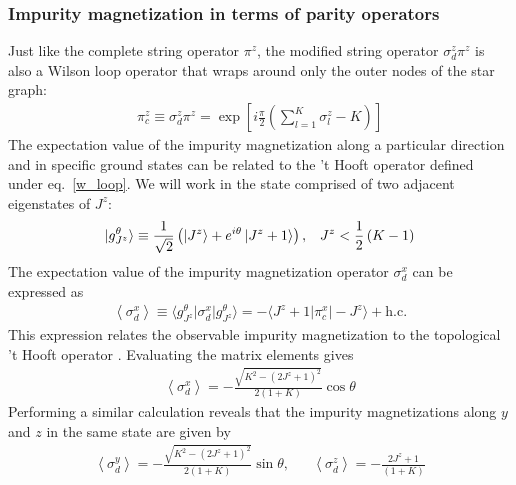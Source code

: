 \documentclass[reprint,prb,superscriptaddress]{revtex4-2}
\begin{document}
\subsubsection{Impurity magnetization in terms of parity operators}
Just like the complete string operator \(\pi^z\), the modified string operator \(\sigma_d^z \pi^z\) is also a Wilson loop operator that wraps around only the outer nodes of the star graph:
\begin{equation}\begin{aligned}
	\pi^z_c \equiv \sigma_d^z \pi^z = \exp\left[i \frac{\pi}{2} \left(\sum_{l=1}^K \sigma^z_l - K\right)\right] 
\end{aligned}\end{equation}
The expectation value of the impurity magnetization along a particular direction and in specific ground states can be related to the 't Hooft operator defined under eq.~\ref{w_loop}. We will work in the state comprised of two adjacent eigenstates of \(J^z\):
\begin{equation}\begin{aligned}
	\ket{g^\theta_{J^z}} \equiv \frac{1}{\sqrt 2}\left( \ket{J^z} + e^{i\theta}\ket{J^z+1}\right), && J^z < \frac{1}{2}\left( K-1 \right)
\end{aligned}\end{equation}
The expectation value of the impurity magnetization operator \(\sigma_d^x\) can be expressed as
\begin{equation}\begin{aligned}
	\left<\sigma_d^x\right> \equiv \langle g^\theta_{J^z} \vert \sigma_d^x \vert g^\theta_{J^z}\rangle = - \langle J^z + 1 \vert \pi^x_c \vert -J^z \rangle + \text{h.c.}
\end{aligned}\end{equation}
This expression relates the observable impurity magnetization to the topological 't Hooft operator \cite{Maric2020}. Evaluating the matrix elements gives
\begin{equation}\begin{aligned}
	\label{sigmax}
	\left<\sigma_d^x\right> = - \frac{\sqrt{K^2 - (2J^z + 1)^2}}{2(1+K)}\cos \theta
\end{aligned}\end{equation}
Performing a similar calculation reveals that the impurity magnetizations along \(y\) and \(z\) in the same state are given by
\begin{equation}\begin{aligned}
	\label{sigmayz}
	\left<\sigma_d^y\right> = - \frac{\sqrt{K^2 - (2J^z + 1)^2}}{2(1+K)}\sin \theta, &&\left<\sigma_d^z\right> = - \frac{2J^z + 1}{(1+K)}
\end{aligned}\end{equation}
\end{document}
